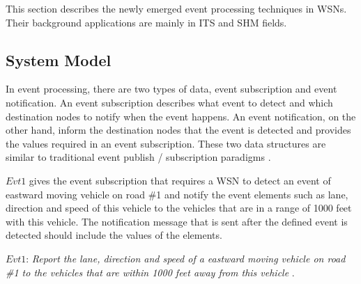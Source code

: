 \documentclass[12pt,journal,draftcls,letterpaper,onecolumn]{elsarticle}
\begin{document}
 This section describes the newly emerged
event processing techniques in WSNs. Their background applications
are mainly in ITS and SHM fields.

\subsection{System Model}
\label{sec:System Model}

In event processing, there are two types of data, event subscription
and event notification. An event subscription describes what event
to detect and which destination nodes to notify when the event
happens. An event notification, on the other hand, inform the
destination nodes that the event is detected and provides the values
required in an event subscription. These two data structures are
similar to traditional event publish / subscription paradigms 
\cite{DBLP:journals/tocs/CarzanigaRW01}.

$Evt1$ gives the event subscription that requires a WSN to detect an
event of eastward moving vehicle on road \#1 and notify the event
elements such as lane, direction and speed of this vehicle to the
vehicles that are in a range of 1000 feet with this vehicle. The
notification message that is sent after the defined event is
detected should include the values of the elements.

$Evt1$: \emph{Report the lane, direction and speed of a eastward
moving vehicle on road \#1 to the vehicles that are within 1000 feet
away from this vehicle }.



%
%
\end{document}
